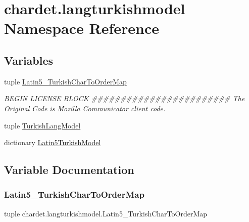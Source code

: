 \hypertarget{namespacechardet_1_1langturkishmodel}{}\section{chardet.\+langturkishmodel Namespace Reference}
\label{namespacechardet_1_1langturkishmodel}
\subsection*{Variables}
\begin{DoxyCompactItemize}
\item 
tuple \hyperlink{namespacechardet_1_1langturkishmodel_a49d8f8805895b0582a8855414c1fd0f8}{Latin5\+\_\+\+Turkish\+Char\+To\+Order\+Map}
\begin{DoxyCompactList}\small\item\em B\+E\+G\+IN L\+I\+C\+E\+N\+SE B\+L\+O\+CK \#\#\#\#\#\#\#\#\#\#\#\#\#\#\#\#\#\#\#\#\#\#\#\# The Original Code is Mozilla Communicator client code. \end{DoxyCompactList}\item 
tuple \hyperlink{namespacechardet_1_1langturkishmodel_ad4193c6626570c45885edfa65ecf7be1}{Turkish\+Lang\+Model}
\item 
dictionary \hyperlink{namespacechardet_1_1langturkishmodel_af7bda724757aa06e712222106cbdf270}{Latin5\+Turkish\+Model}
\end{DoxyCompactItemize}


\subsection{Variable Documentation}
\mbox{\label{namespacechardet_1_1langturkishmodel_a49d8f8805895b0582a8855414c1fd0f8}} 
\subsubsection{\texorpdfstring{Latin5\+\_\+\+Turkish\+Char\+To\+Order\+Map}{Latin5\_TurkishCharToOrderMap}}
{\footnotesize\ttfamily tuple chardet.\+langturkishmodel.\+Latin5\+\_\+\+Turkish\+Char\+To\+Order\+Map}

